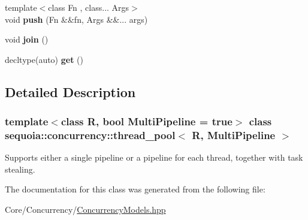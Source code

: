 \begin{DoxyCompactItemize}
\item 
\mbox{\label{classsequoia_1_1concurrency_1_1thread__pool_adb11d6a2fed4083362f2f743067057a4}} 
{\footnotesize template$<$class Fn , class... Args$>$ }\\void {\bfseries push} (Fn \&\&fn, Args \&\&... args)
\item 
\mbox{\label{classsequoia_1_1concurrency_1_1thread__pool_a3c2988cc8f3e5db3996ada7500f38cf1}} 
void {\bfseries join} ()
\item 
\mbox{\label{classsequoia_1_1concurrency_1_1thread__pool_abb98a8e37717f88394899aeaf231ff3c}} 
decltype(auto) {\bfseries get} ()
\end{DoxyCompactItemize}


\subsection{Detailed Description}
\subsubsection*{template$<$class R, bool Multi\+Pipeline = true$>$\newline
class sequoia\+::concurrency\+::thread\+\_\+pool$<$ R, Multi\+Pipeline $>$}

Supports either a single pipeline or a pipeline for each thread, together with task stealing. 

The documentation for this class was generated from the following file\+:\begin{DoxyCompactItemize}
\item 
Core/\+Concurrency/\mbox{\hyperlink{_concurrency_models_8hpp}{Concurrency\+Models.\+hpp}}\end{DoxyCompactItemize}
